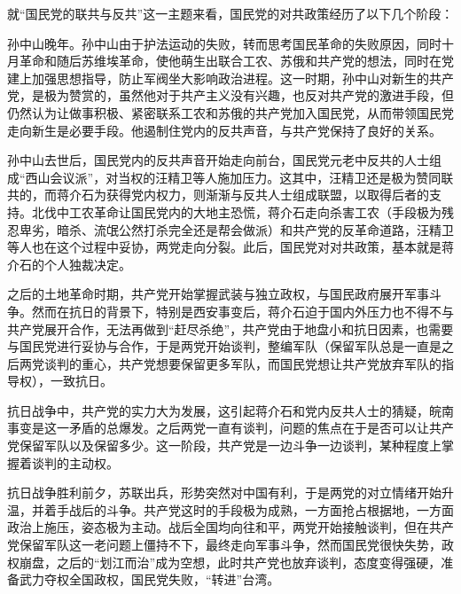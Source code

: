 就“国民党的联共与反共”这一主题来看，国民党的对共政策经历了以下几个阶段：
\begin{enumerate*}
    \item 孙中山晚年。孙中山由于护法运动的失败，转而思考国民革命的失败原因，同时十月革命和随后苏维埃革命，使他萌生出联合工农、苏俄和共产党的想法，同时在党建上加强思想指导，防止军阀坐大影响政治进程。这一时期，孙中山对新生的共产党，是极为赞赏的，虽然他对于共产主义没有兴趣，也反对共产党的激进手段，但仍然认为让做事积极、紧密联系工农和苏俄的共产党加入国民党，从而带领国民党走向新生是必要手段。他遏制住党内的反共声音，与共产党保持了良好的关系。
    \item 孙中山去世后，国民党内的反共声音开始走向前台，国民党元老中反共的人士组成“西山会议派”，对当权的汪精卫等人施加压力。这其中，汪精卫还是极为赞同联共的，而蒋介石为获得党内权力，则渐渐与反共人士组成联盟，以取得后者的支持。北伐中工农革命让国民党内的大地主恐慌，蒋介石走向杀害工农（手段极为残忍卑劣，暗杀、流氓公然打杀完全还是帮会做派）和共产党的反革命道路，汪精卫等人也在这个过程中妥协，两党走向分裂。此后，国民党对对共政策，基本就是蒋介石的个人独裁决定。
    \item 之后的土地革命时期，共产党开始掌握武装与独立政权，与国民政府展开军事斗争。然而在抗日的背景下，特别是西安事变后，蒋介石迫于国内外压力也不得不与共产党展开合作，无法再做到“赶尽杀绝”，共产党由于地盘小和抗日因素，也需要与国民党进行妥协与合作，于是两党开始谈判，整编军队（保留军队总是一直是之后两党谈判的重心，共产党想要保留更多军队，而国民党想让共产党放弃军队的指导权），一致抗日。
    \item 抗日战争中，共产党的实力大为发展，这引起蒋介石和党内反共人士的猜疑，皖南事变是这一矛盾的总爆发。之后两党一直有谈判，问题的焦点在于是否可以让共产党保留军队以及保留多少。这一阶段，共产党是一边斗争一边谈判，某种程度上掌握着谈判的主动权。
    \item 抗日战争胜利前夕，苏联出兵，形势突然对中国有利，于是两党的对立情绪开始升温，并着手战后的斗争。共产党这时的手段极为成熟，一方面抢占根据地，一方面政治上施压，姿态极为主动。战后全国均向往和平，两党开始接触谈判，但在共产党保留军队这一老问题上僵持不下，最终走向军事斗争，然而国民党很快失势，政权崩盘，之后的“划江而治”成为空想，此时共产党也放弃谈判，态度变得强硬，准备武力夺权全国政权，国民党失败，“转进”台湾。
\end{enumerate*}

